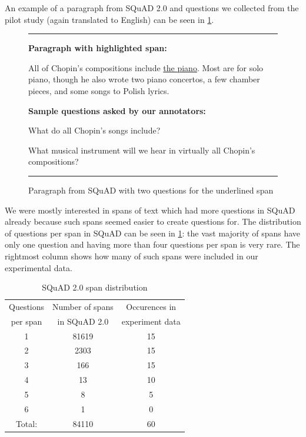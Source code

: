 An example of a paragraph from SQuAD 2.0 and questions we collected from the \ptakopet{} pilot study (again translated to English) can be seen in \cref{fig:squad_par}.

\begin{figure}[ht]
    \noindent\rule{\linewidth}{0.5pt}
    \textbf{Paragraph with highlighted span:}
    
     All of Chopin's compositions include {\underline{the piano}}. Most are for solo piano, though he also wrote two piano concertos, a few chamber pieces, and some songs to Polish lyrics. 
    
    \textbf{Sample questions asked by our annotators:}
    
    What do all Chopin's songs include?
    
    What musical instrument will we hear in virtually all Chopin's compositions?
    
    \vspace{-0.2cm}\noindent\rule{\linewidth}{0.5pt}\vspace{-0.3cm}
    \caption{\label{fig:squad_par} Paragraph from SQuAD with two questions for
    the underlined span}
\end{figure}

We were mostly interested in spans of text which had more questions in SQuAD already because such spans seemed easier to create questions for. The distribution of questions per span in SQuAD can be seen in \cref{tab:squad_distribution}: the vast majority of spans have only one question and having more than four questions per span is very rare.
The rightmost column shows how many of such spans were included in our experimental data.

\begin{table}[ht]
    \centering
    \begin{tabular}{| c c c |}
        \hline
        Questions & Number of spans & Occurences in \\
        per span & in SQuAD 2.0 & experiment data \\
        \hline
        1&   81619& 15\\
        2&    2303& 15\\
        3&     166& 15\\
        4&      13& 10\\
        5&       8&  5\\
        6&       1&  0\\
        \hline
        Total: & 84110  & 60 \\
        \hline
    \end{tabular}
    \caption{\label{tab:squad_distribution}SQuAD 2.0 span distribution}
\end{table}

